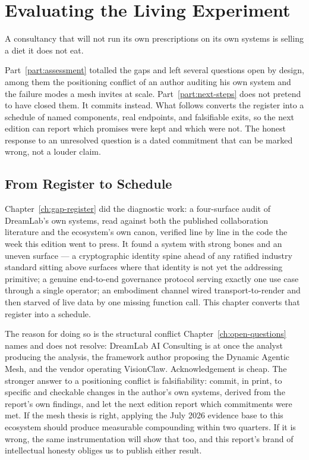 \chapter{Evaluating the Living Experiment}
\label{ch:ecosystem-roadmap}

\epigraph{A consultancy that will not run its own prescriptions on its own systems is selling a diet it does not eat.}{}

Part~\ref{part:assessment} totalled the gaps and left several questions open by design, among them the positioning conflict of an author auditing his own system and the failure modes a mesh invites at scale. Part~\ref{part:next-steps} does not pretend to have closed them. It commits instead. What follows converts the register into a schedule of named components, real endpoints, and falsifiable exits, so the next edition can report which promises were kept and which were not. The honest response to an unresolved question is a dated commitment that can be marked wrong, not a louder claim.

\section{From Register to Schedule}

Chapter~\ref{ch:gap-register} did the diagnostic work: a four-surface audit of DreamLab's own systems, read against both the published collaboration literature and the ecosystem's own canon, verified line by line in the code the week this edition went to press. It found a system with strong bones and an uneven surface --- a cryptographic identity spine ahead of any ratified industry standard sitting above surfaces where that identity is not yet the addressing primitive; a genuine end-to-end governance protocol serving exactly one use case through a single operator; an embodiment channel wired transport-to-render and then starved of live data by one missing function call. This chapter converts that register into a schedule.

The reason for doing so is the structural conflict Chapter~\ref{ch:open-questions} names and does not resolve: DreamLab AI Consulting is at once the analyst producing the analysis, the framework author proposing the Dynamic Agentic Mesh, and the vendor operating VisionClaw. Acknowledgement is cheap. The stronger answer to a positioning conflict is falsifiability: commit, in print, to specific and checkable changes in the author's own systems, derived from the report's own findings, and let the next edition report which commitments were met. If the mesh thesis is right, applying the July 2026 evidence base to this ecosystem should produce measurable compounding within two quarters. If it is wrong, the same instrumentation will show that too, and this report's brand of intellectual honesty obliges us to publish either result.

